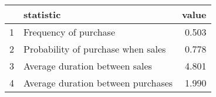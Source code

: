 \begin{tabular}{rlr}
  \hline
 & statistic & value \\ 
  \hline
1 & Frequency of purchase & 0.503 \\ 
  2 & Probability of purchase when sales & 0.778 \\ 
  3 & Average duration between sales & 4.801 \\ 
  4 & Average duration between purchases & 1.990 \\ 
   \hline
\end{tabular}

